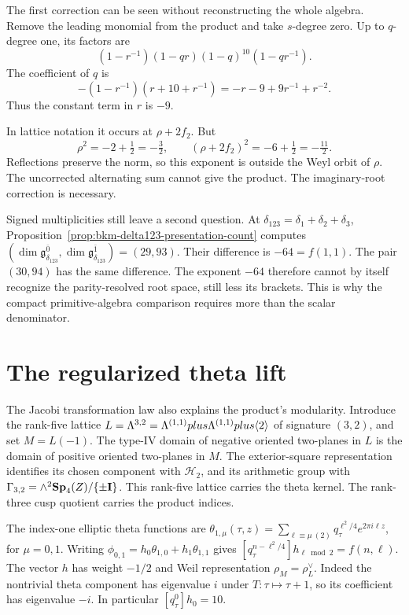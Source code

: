 The first correction can be seen without reconstructing the whole
algebra. Remove the leading monomial from the product and take
\(s\)-degree zero. Up to \(q\)-degree one, its factors are
\[
 (1-r^{-1})(1-qr)(1-q)^{10}(1-qr^{-1}).
\]
The coefficient of \(q\) is
\[
 -(1-r^{-1})(r+10+r^{-1})=-r-9+9r^{-1}+r^{-2}.
\]
Thus the constant term in \(r\) is \(-9\).

In lattice notation
it occurs at \(\rho+2f_2\). But
\[
 \rho^2=-2+\tfrac12=-\tfrac32,\qquad
 (\rho+2f_2)^2=-6+\tfrac12=-\tfrac{11}{2}.
\]
Reflections preserve the norm, so this exponent is outside the Weyl
orbit of \(\rho\). The uncorrected alternating sum cannot give
the product. The imaginary-root correction is necessary.

Signed multiplicities still leave a second question. At
\(\delta_{123}=\delta_1+\delta_2+\delta_3\),
Proposition~\ref{prop:bkm-delta123-presentation-count} computes
\((\dim\mathfrak g^{\bar0}_{\delta_{123}},
\dim\mathfrak g^{\bar1}_{\delta_{123}})=(29,93)\).
Their difference is \(-64=f(1,1)\). The pair \((30,94)\) has the
same difference. The exponent \(-64\) therefore cannot by itself
recognize the parity-resolved root space, still less its brackets.
This is why the compact primitive-algebra comparison requires more
than the scalar denominator.

\section{The regularized theta lift}
\label{sec:edge-1-5}

The Jacobi transformation law also explains the product's
modularity. Introduce the rank-five lattice
\(L=\Lambda^{3,2}=\Lambda^{(1,1)}plus\Lambda^{(1,1)}plus\langle2\rangle\)
of signature \((3,2)\), and set \(M=L(-1)\).
The type-IV domain of negative oriented two-planes in \(L\) is the
domain of positive oriented two-planes in \(M\).
The exterior-square representation identifies its chosen component
with \(\mathcal H_2\), and its arithmetic group with
\(\Gamma_{3,2}=\wedge^2\mathbf{Sp}_4(Z)/\{\pm\mathbf{I}\}\).
This rank-five lattice carries the theta kernel. The rank-three
cusp quotient carries the product indices.

The index-one elliptic theta functions are
\(\theta_{1,\mu}(\tau,z)=\sum_{\ell\equiv\mu\ (2)}
q_\tau^{\ell^2/4}e^{2\pi i\ell z}\), for \(\mu=0,1\).
Writing \(\phi_{0,1}=h_0\theta_{1,0}+h_1\theta_{1,1}\) gives
\([q_\tau^{n-\ell^2/4}]h_{\ell\bmod2}=f(n,\ell)\).
The vector \(h\) has weight \(-1/2\) and Weil representation
\(\rho_M=\rho_L^\vee\). Indeed the nontrivial theta component
has eigenvalue \(i\) under \(T:\tau\mapsto\tau+1\),
so its coefficient has eigenvalue
\(-i\). In particular \([q_\tau^0]h_0=10\).

